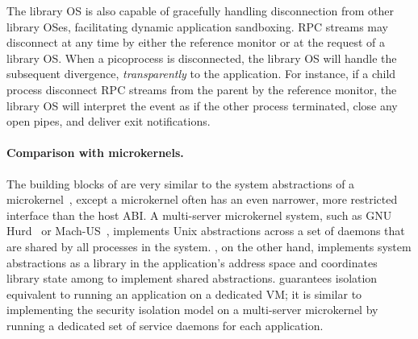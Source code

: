 

The \graphene{} library OS is also capable of gracefully handling disconnection from other library OSes, facilitating dynamic application sandboxing.
RPC streams may disconnect at any time by either the reference monitor or at the request of a library OS.
When a picoprocess is disconnected, the library OS will handle the subsequent
divergence, %
{\em transparently} to the application.
For instance, if a child process disconnect RPC streams from the parent by the reference monitor, the library OS will interpret the event as if the other process terminated, close any open pipes, and deliver exit notifications.



\paragraph{Comparison with microkernels.}
The building blocks of \graphene{} are very similar to the system abstractions of a 
microkernel~\cite{liedtke95sosp,klein09sel4,elphinstone13microkernels,liedtke93sosp,chen93memory,baron1985mach-1,accetta86mach}, except a microkernel often has an even narrower, more restricted interface than the host ABI.
A multi-server microkernel system, such as GNU Hurd~\cite{hurd} or Mach-US~\cite{stevenson95mach-us}, implements Unix abstractions across a set of daemons that are shared by all processes in the system. \graphene{}, on the other hand, implements system abstractions as a library in the application's address space and coordinates library state among \picoprocs{} to implement shared abstractions. \graphene{} guarantees isolation equivalent to running 
an application on a dedicated VM; it is similar to implementing the security isolation model on a multi-server microkernel by running a dedicated set of service daemons for each application.

